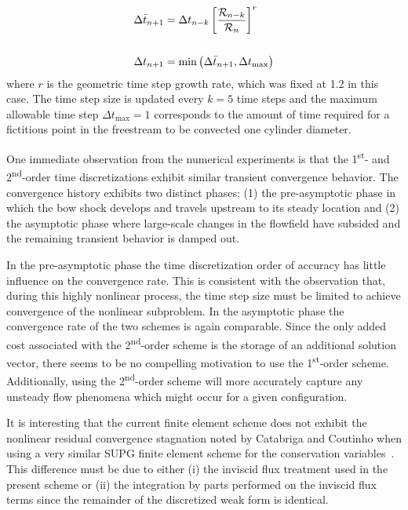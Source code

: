 \begin{align}
  \Delta \bar{t}_{n+1} &= \Delta t_{n-k} \left[\frac{\mathcal{R}_{n-k}}{\mathcal{R}_{n}}\right]^r \label{geometric_timestep_growth} \\ \vspace{1em}
                 & \nonumber \\
  \Delta t_{n+1} &= \min\left(\Delta \bar{t}_{n+1},\Delta t_{\text{max}}\right) \label{dt_limiting}
\end{align}
where $r$ is the geometric time step growth rate, which was fixed at 1.2 in this case.  The time step size is updated every $k=5$ time steps and the maximum allowable time step $\Delta t_{\text{max}}=1$ corresponds to the amount of time required for a fictitious point in the freestream to be convected one cylinder diameter.

One immediate observation from the numerical experiments is that the 1\textsuperscript{st}- and 2\textsuperscript{nd}-order time discretizations exhibit similar transient convergence behavior. The convergence history exhibits two distinct phases: (1) the pre-asymptotic phase in which the bow shock develops and travels upstream to its steady location and (2) the asymptotic phase where large-scale changes in the flowfield have subsided and the remaining transient behavior is damped out.

In the pre-asymptotic phase the time discretization order of accuracy has little influence on the convergence rate.  This is consistent with the observation that, during this highly nonlinear process, the time step size must be limited to achieve convergence of the nonlinear subproblem. In the asymptotic phase the convergence rate of the two schemes is again comparable. Since the only added cost associated with the 2\textsuperscript{nd}-order scheme is the storage of an additional solution vector, there seems to be no compelling motivation to use the 1\textsuperscript{st}-order scheme.  Additionally, using the 2\textsuperscript{nd}-order scheme will more accurately capture any unsteady flow phenomena which might occur for a given configuration.

It is interesting that the current finite element scheme does not exhibit the nonlinear residual convergence stagnation noted by Catabriga and Coutinho when using a very similar SUPG finite element scheme for the conservation variables~\cite{catabriga_coutinho_SUPG_convergence}.  This difference must be due to either (i) the inviscid flux treatment used in the present scheme or (ii) the integration by parts performed on the inviscid flux terms since the remainder of the discretized weak form is identical.

